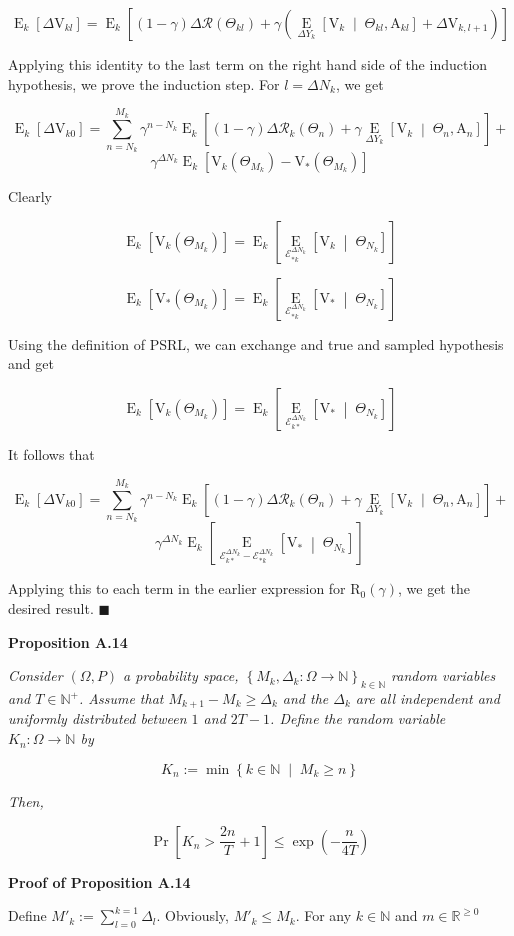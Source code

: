 \documentclass[a4paper]{article}
\newcommand{\Co}[1]{}
\newcommand{\AP}[1]{\left(#1\right)}
\newcommand{\AB}[1]{\left[#1\right]}
\newcommand{\AC}[1]{\left\{#1\right\}}
\newcommand{\ABM}[2]{\left[#1\;\middle\vert\;#2\right]}
\newcommand{\ACM}[2]{\left\{#1\;\middle\vert\;#2\right\}}
\newcommand{\Pa}[2]{\underset{#1}{\operatorname{Pr}}\AB{#2}}
\newcommand{\CE}[3]{\underset{#1}{\operatorname{E}}\ABM{#2}{#3}}
\newcommand{\Nats}{\mathbb{N}}
\newcommand{\Reals}{\mathbb{R}}
\newcommand{\R}{\mathcal{R}}
\newcommand{\V}{\mathrm{V}}
\newcommand{\Reg}{\mathrm{R}}
\newcommand{\SHy}{Y}
\newcommand{\AT}{\mathrm{A}}
\newcommand{\Ev}{\mathcal{E}}
\newcommand{\ET}{N}
\newcommand{\IT}{M}
\newcommand{\TE}[1]{{\operatorname{E}_k}\AB{#1}}
\begin{document}
$$\TE{\Delta\V_{kl}}=\TE{(1-\gamma)\Delta\R\AP{\Theta_{kl}}+\gamma\AP{\CE{\Delta\SHy_k}{\V_k}{\Theta_{kl},\AT_{kl}}+\Delta\V_{k,l+1}}}$$

Applying this identity to the last term on the right hand side of the induction hypothesis, we prove the induction step. For $l=\Delta\ET_k$, we get

$$\TE{\Delta\V_{k0}}=\sum_{n=\ET_k}^{\IT_k}\gamma^{n-\ET_k}\TE{(1-\gamma)\Delta\R_k\AP{\Theta_n}+\gamma\CE{\Delta\SHy_k}{\V_{k}}{\Theta_n,\AT_n}}+$$
$$\gamma^{\Delta\ET_k}\TE{\V_k\AP{\Theta_{\IT_k}}-\V_*\AP{\Theta_{\IT_k}}}$$

Clearly

$$\TE{\V_k\AP{\Theta_{\IT_k}}}=\TE{\CE{\Ev_{*k}^{\Delta\ET_k}}{\V_k}{\Theta_{\ET_k}}}$$

$$\TE{\V_*\AP{\Theta_{\IT_k}}}=\TE{\CE{\Ev_{*k}^{\Delta\ET_k}}{\V_*}{\Theta_{\ET_k}}}$$

Using the definition of PSRL, we can exchange and true and sampled hypothesis and get

$$\TE{\V_k\AP{\Theta_{\IT_k}}}=\TE{\CE{\Ev_{k*}^{\Delta\ET_k}}{\V_*}{\Theta_{\ET_k}}}$$

It follows that

$$\TE{\Delta\V_{k0}}=\sum_{n=\ET_k}^{\IT_k}\gamma^{n-\ET_k}\TE{(1-\gamma)\Delta\R_k\AP{\Theta_n}+\gamma\CE{\Delta\SHy_k}{\V_{k}}{\Theta_n,\AT_n}}+$$
$$\gamma^{\Delta\ET_k}\TE{\CE{\Ev_{k*}^{\Delta\ET_k}-\Ev_{*k}^{\Delta\ET_k}}{\V_*}{\Theta_{\ET_k}}}$$

Applying this to each term in the earlier expression for $\Reg_0(\gamma)$, we get the desired result. $\blacksquare$

\textbf{Proposition A.14}\Co{b}

\textit{Consider $(\Omega,P)$ a probability space, $\AC{M_k,\Delta_k:\Omega\rightarrow\Nats}_{k\in\Nats}$ random variables and $T\in\Nats^+$. Assume that $M_{k+1}-M_k\geq\Delta_k$ and the $\Delta_k$ are all independent and uniformly distributed between $1$ and $2T-1$. Define the random variable $K_n:\Omega\rightarrow\Nats$ by}\Co{i}

$$K_n:=\min\ACM{k\in\Nats}{M_k\geq n}$$

\textit{Then,}\Co{i}

$$\Pa{}{K_n>\frac{2n}{T}+1}\leq\exp\AP{-\frac{n}{4T}}$$

\textbf{Proof of Proposition A.14}\Co{b}

Define $M'_k:=\sum_{l=0}^{k=1}\Delta_l$. Obviously, $M'_k\leq M_k$. For any $k\in\Nats$ and $m\in\Reals^{\geq0}$
\end{document}
